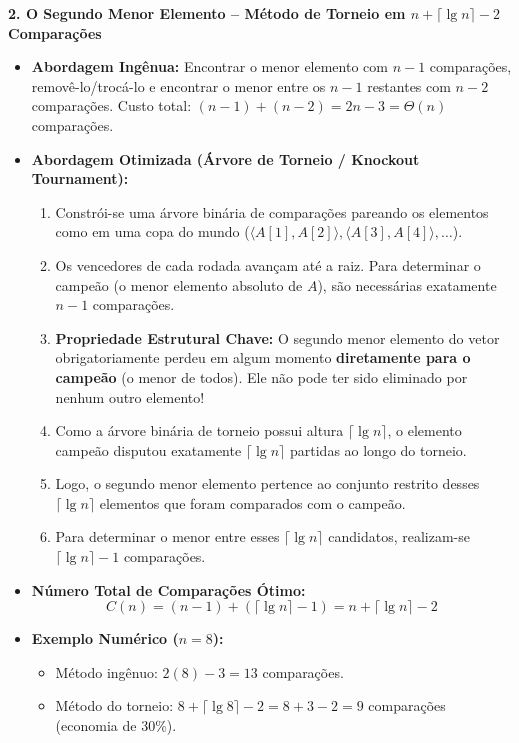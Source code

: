 \documentclass[11pt,a4paper]{article}
\newcommand{\topico}[1]{\par\medskip\textbf{\color{azul}#1}\par}
\begin{document}
\topico{2. O Segundo Menor Elemento -- Método de Torneio em $n + \lceil \lg n \rceil - 2$ Comparações}
\begin{itemize}
  \item \textbf{Abordagem Ingênua:} Encontrar o menor elemento com $n - 1$ comparações, removê-lo/trocá-lo e encontrar o menor entre os $n-1$ restantes com $n - 2$ comparações. Custo total: $(n-1) + (n-2) = 2n - 3 = \Theta(n)$ comparações.
  \item \textbf{Abordagem Otimizada (Árvore de Torneio / Knockout Tournament):}
  \begin{enumerate}
    \item Constrói-se uma árvore binária de comparações pareando os elementos como em uma copa do mundo ($\langle A[1], A[2] \rangle, \langle A[3], A[4] \rangle, \dots$).
    \item Os vencedores de cada rodada avançam até a raiz. Para determinar o campeão (o menor elemento absoluto de $A$), são necessárias exatamente $n - 1$ comparações.
    \item \textbf{Propriedade Estrutural Chave:} O segundo menor elemento do vetor obrigatoriamente perdeu em algum momento \textbf{diretamente para o campeão} (o menor de todos). Ele não pode ter sido eliminado por nenhum outro elemento!
    \item Como a árvore binária de torneio possui altura $\lceil \lg n \rceil$, o elemento campeão disputou exatamente $\lceil \lg n \rceil$ partidas ao longo do torneio.
    \item Logo, o segundo menor elemento pertence ao conjunto restrito desses $\lceil \lg n \rceil$ elementos que foram comparados com o campeão.
    \item Para determinar o menor entre esses $\lceil \lg n \rceil$ candidatos, realizam-se $\lceil \lg n \rceil - 1$ comparações.
  \end{enumerate}
  \item \textbf{Número Total de Comparações Ótimo:}
  \[
  \boxed{C(n) = (n - 1) + (\lceil \lg n \rceil - 1) = n + \lceil \lg n \rceil - 2}
  \]
  \item \textbf{Exemplo Numérico ($n = 8$):}
  \begin{itemize}
    \item Método ingênuo: $2(8) - 3 = 13$ comparações.
    \item Método do torneio: $8 + \lceil \lg 8 \rceil - 2 = 8 + 3 - 2 = 9$ comparações (economia de 30\%).
  \end{itemize}
\end{itemize}
\end{document}
